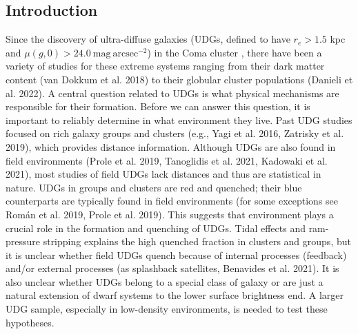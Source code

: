 \documentclass[twocolumn,astrosymb,twocolappendix]{aastex631}
\begin{document}
\begin{CJK*}{UTF8}{gbsn}

\begin{abstract}

\end{abstract}



\section{Introduction} \label{sec:intro}

Since the discovery of ultra-diffuse galaxies (UDGs, defined to have $r_e > 1.5$ kpc and $\mu(g,0)>24.0\ \mathrm{mag\ arcsec^{-2}}$) in the Coma cluster \citep{vanDokkum2015}, there have been a variety of studies for these extreme systems ranging from their dark matter content (van Dokkum et al. 2018) to their globular cluster populations (Danieli et al. 2022). A central question related to UDGs is what physical mechanisms are responsible for their formation. Before we can answer this question, it is important to reliably determine in what environment they live.
Past UDG studies focused on rich galaxy groups and clusters (e.g., Yagi et al. 2016, Zatrisky et al. 2019), which provides distance information. Although UDGs are also found in field environments (Prole et al. 2019, Tanoglidis et al. 2021, Kadowaki et al. 2021), most studies of field UDGs lack distances and thus are statistical in nature. UDGs in groups and clusters are red and quenched; their blue counterparts are typically found in field environments (for some exceptions see Rom\'{a}n et al. 2019, Prole et al. 2019). This suggests that environment plays a crucial role in the formation and quenching of UDGs. Tidal effects and ram-pressure stripping explains the high quenched fraction in clusters and groups, but it is unclear whether field UDGs quench because of internal processes (feedback) and/or external processes (as splashback satellites, Benavides et al. 2021). It is also unclear whether UDGs belong to a special class of galaxy or are just a natural extension of dwarf systems to the lower surface brightness end. A larger UDG sample, especially in low-density environments, is needed to test these hypotheses.


\end{CJK*}
\end{document}
